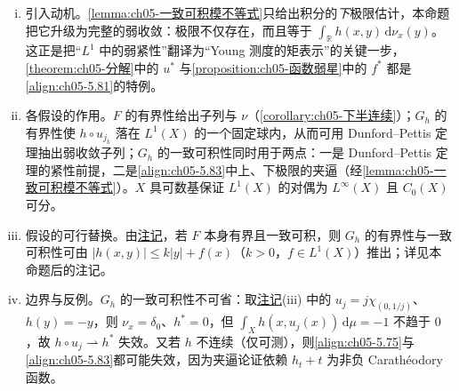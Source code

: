 \documentclass[../../main.tex]{subfiles}
\begin{document}
\begin{remark}\label{remark:ch05-弱收敛注}
\begin{enumerate}[(i)]
\item 引入动机。\cref{lemma:ch05-一致可积模不等式}只给出积分的\emph{下}极限估计，本命题把它升级为完整的弱收敛：极限不仅存在，而且等于 $\int_{\mathbb{R}}h(x,y)\,\mathrm{d}\nu_x(y)$。这正是把“$L^1$ 中的弱紧性”翻译为“Young 测度的矩表示”的关键一步，\cref{theorem:ch05-分解}中的 $u^*$ 与\cref{proposition:ch05-函数弱星}中的 $f^*$ 都是\eqref{align:ch05-5.81}的特例。

\item 各假设的作用。$F$ 的有界性给出子列与 $\nu$（\cref{corollary:ch05-下半连续}）；$G_h$ 的有界性使 $h\circ u_{j_k}$ 落在 $L^1(X)$ 的一个固定球内，从而可用 Dunford--Pettis 定理抽出弱收敛子列；$G_h$ 的一致可积性同时用于两点：一是 Dunford--Pettis 定理的紧性前提，二是\eqref{align:ch05-5.83}中上、下极限的夹逼（经\cref{lemma:ch05-一致可积模不等式}）。$X$ 具可数基保证 $L^1(X)$ 的对偶为 $L^\infty(X)$ 且 $C_0(X)$ 可分。

\item 假设的可行替换。由\hyperref[remark:ch02-正负一致可积]{注记}，若 $F$ 本身有界且一致可积，则 $G_h$ 的有界性与一致可积性可由 $|h(x,y)|\leqslant k|y|+f(x)$（$k>0$，$f\in L^1(X)$）推出；详见本命题后的注记。

\item 边界与反例。$G_h$ 的一致可积性不可省：取\hyperref[remark:ch05-一致可积模不等式]{注记}(iii) 中的 $u_j=j\chi_{(0,1/j)}$、$h(y)=-y$，则 $\nu_x=\delta_0$、$h^*=0$，但 $\int_Xh(x,u_j(x))\,\mathrm{d}\mu=-1$ 不趋于 $0$，故 $h\circ u_j\rightharpoonup h^*$ 失效。又若 $h$ 不连续（仅可测），则\eqref{align:ch05-5.75}与\eqref{align:ch05-5.83}都可能失效，因为夹逼论证依赖 $h_t+t$ 为非负 Carathéodory 函数。
\end{enumerate}
\end{remark}
\end{document}
